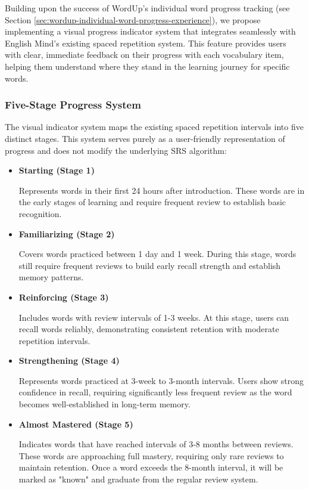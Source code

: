 Building upon the success of WordUp's individual word progress tracking (see Section \ref{sec:wordup-individual-word-progress-experience}), we propose implementing a visual progress indicator system that integrates seamlessly with English Mind's existing spaced repetition system. This feature provides users with clear, immediate feedback on their progress with each vocabulary item, helping them understand where they stand in the learning journey for specific words.

\subsubsection{Five-Stage Progress System}

The visual indicator system maps the existing spaced repetition intervals into five distinct stages. This system serves purely as a user-friendly representation of progress and does not modify the underlying SRS algorithm:


\begin{itemize}
    \item \textbf{Starting (Stage 1)}
    
    Represents words in their first 24 hours after introduction. These words are in the early stages of learning and require frequent review to establish basic recognition.
    
    \item \textbf{Familiarizing (Stage 2)}
    
    Covers words practiced between 1 day and 1 week. During this stage, words still require frequent reviews to build early recall strength and establish memory patterns.
    
    \item \textbf{Reinforcing (Stage 3)}
    
    Includes words with review intervals of 1-3 weeks. At this stage, users can recall words reliably, demonstrating consistent retention with moderate repetition intervals.
    
    \item \textbf{Strengthening (Stage 4)}
    
    Represents words practiced at 3-week to 3-month intervals. Users show strong confidence in recall, requiring significantly less frequent review as the word becomes well-established in long-term memory.
    
    \item \textbf{Almost Mastered (Stage 5)}
    
    Indicates words that have reached intervals of 3-8 months between reviews. These words are approaching full mastery, requiring only rare reviews to maintain retention. Once a word exceeds the 8-month interval, it will be marked as "known" and graduate from the regular review system.
\end{itemize}

